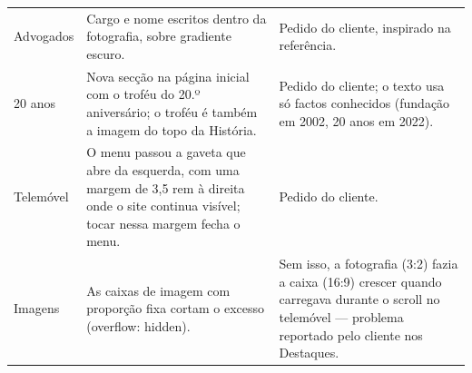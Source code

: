 \begin{longtable}{p{3.2cm}p{6.4cm}p{5.4cm}}
Advogados & Cargo e nome escritos dentro da fotografia, sobre gradiente escuro. & Pedido do cliente, inspirado na referência. \\
20 anos & Nova secção na página inicial com o troféu do 20.º aniversário; o troféu é também a imagem do topo da História. & Pedido do cliente; o texto usa só factos conhecidos (fundação em 2002, 20 anos em 2022). \\
Telemóvel & O menu passou a gaveta que abre da esquerda, com uma margem de 3,5 rem à direita onde o site continua visível; tocar nessa margem fecha o menu. & Pedido do cliente. \\
Imagens & As caixas de imagem com proporção fixa cortam o excesso (overflow: hidden). & Sem isso, a fotografia (3:2) fazia a caixa (16:9) crescer quando carregava durante o scroll no telemóvel — problema reportado pelo cliente nos Destaques. \\
\bottomrule
\end{longtable}
